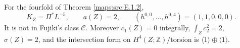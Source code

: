 \begin{theorem}\label{maps:src:E.2.1}


For the fourfold of Theorem \ref{maps:src:E.1.2},
\[
 K_Z=\Pi^*L^{-5},\qquad a(Z)=2,\qquad
 (h^{0,0},\ldots,h^{0,4})=(1,1,0,0,0).
 \tag{E.12}\label{maps:eq:E.12}
\]
It is not in Fujiki's class $\mathcal C$.  Moreover
$c_1(Z)=0$ integrally, $\int_Zc_2^2=2$, $\sigma(Z)=2$, and
the intersection form on $H^4(Z;\mathbb Z)/\mathrm{torsion}$ is
$\langle1\rangle\oplus\langle1\rangle$.

\end{theorem}



